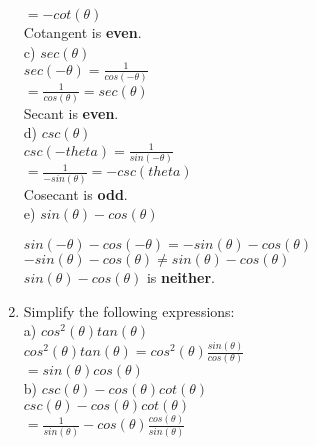 \begin{enumerate}
{\tab\tab $= -cot(\theta)$\\

\tab\tab Cotangent is {\bf even}.\\

\tab c) $sec(\theta)$\\

\tab\tab $sec(-\theta) = \frac{1}{cos(-\theta)}$\\

\tab\tab $= \frac{1}{cos(\theta)} = sec(\theta)$\\

\tab\tab Secant is {\bf even}.\\

\tab d) $csc(\theta)$\\

\tab\tab $csc(-theta) = \frac{1}{sin(-\theta)}$\\

\tab\tab $= \frac{1}{-sin(\theta)} = - csc(theta)$\\

\tab\tab Cosecant is {\bf odd}.\\

\tab e) $sin(\theta) - cos(\theta)$\\}

\tab\tab $sin(-\theta) - cos(-\theta) = -sin(\theta) - cos(\theta)$\\

\tab\tab $-sin(\theta) - cos(\theta) \neq sin(\theta) - cos(\theta)$\\

\tab\tab $sin(\theta) - cos(\theta)$ is {\bf neither}.\\	

\item{Simplify the following expressions:\\

\tab a) $cos^2(\theta)tan(\theta)$\\

\tab\tab $cos^2(\theta)tan(\theta) = cos^2(\theta)\frac{sin(\theta)}{cos(\theta)}$\\

\tab\tab $= sin(\theta)cos(\theta)$\\

\tab b) $csc(\theta) - cos(\theta)cot(\theta)$\\

\tab\tab $csc(\theta) - cos(\theta)cot(\theta)$\\

\tab\tab $= \frac{1}{sin(\theta)} - cos(\theta)\frac{cos(\theta)}{sin(\theta)}$\\

}
\end{enumerate}
